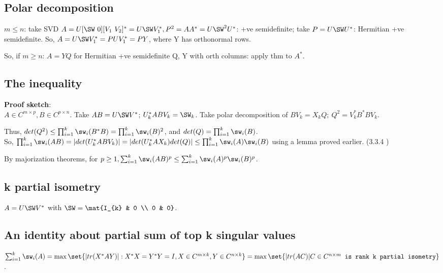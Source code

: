 \documentclass[10pt]{amsart}
\newcommand{\proofSketch}{\textbf{Proof sketch}}
\begin{document}
\subsection{Polar decomposition}
$m \leq n$: take SVD $A = U [\SW\ 0] [V_{1}\ V_{2}]^{*} = U \SW V_{1}^{*},\\
 P^{2} = AA^{*} = U \SW^{2}U^{*}$: +ve semidefinite; take $P = U \SW U^{*}$: Hermitian +ve semidefinite. So, $A = U \SW V_{1}^{*} = PUV_{1}^{*} = PY$, where Y has orthonormal rows.

So, if $m \geq n$: $A = YQ$ for Hermitian +ve semidefinite Q, Y with orth columns: apply thm to $A^{*}$.


\subsection{The inequality }
\proofSketch: \\
$A \in C^{m \times p}, B \in C^{p \times n}$. Take $AB = U\SW V^{*}$; $U_{k}^{*}ABV_k = \SW_{k}$. Take polar decomposition of $BV_{k} = X_{k}Q;\ Q^{2} = V_{k}^{*}B^{*}BV_{k}$.

Thus, $det(Q^{2}) \leq \prod_{i=1}^{k} \sw_{i}(B^{*}B) = \prod_{i=1}^{k}\sw_{i}(B)^{2}$, and $det(Q) = \prod_{i=1}^{k}\sw_{i}(B)$. \\
So, $\prod_{i=1}^{k} \sw_{i}(AB) = |det(U_{k}^{*}ABV_{k})| = |det(U_{k}^{*}AX_{k})det(Q)| \leq \prod_{i=1}^{k}\sw_{i}(A) \sw_{i}(B)$ using a lemma proved earlier. (3.3.4 \cite{hornJohnsonTopics})

By majorization theorems, for $p\geq 1, \sum_{i=1}^{k} \sw_{i}(AB)^{p} \leq \sum_{i=1}^{k} \sw_{i}(A)^{p}\sw_{i}(B)^{p}$.

\subsection{k partial isometry}
$A = U \SW V^{*}$ with $\SW = \mat{I_{k} & 0 \\ 0 & 0}$.

\subsection{An identity about partial sum of top k singular values}
$\sum_{i=1}^{k}\sw_{i}(A) = \max \set{|tr(X^{*}AY)|: X^{*}X = Y^{*}Y = I, X \in C^{m \times k}, Y \in C^{n \times k}}\\
 = \max \set{|tr(AC)| C \in C^{n \times m}\texttt{ is rank k partial isometry}}$.
\end{document}
